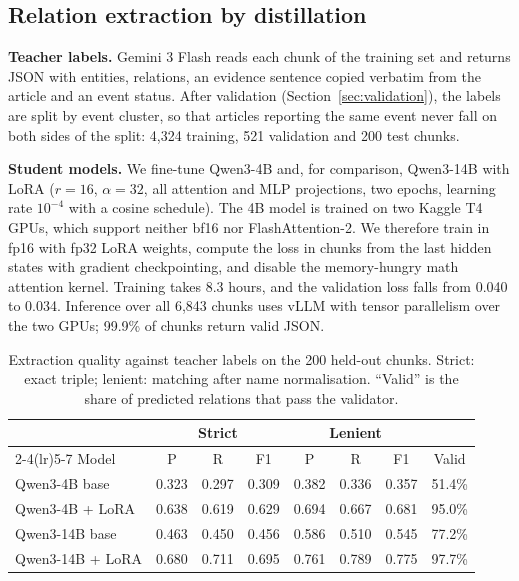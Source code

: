 \documentclass[11pt]{article}
\begin{document}
\subsection{Relation extraction by distillation}
\textbf{Teacher labels.} Gemini 3 Flash reads each chunk of the training set and returns JSON with entities, relations, an evidence sentence copied verbatim from the article and an event status. After validation (Section~\ref{sec:validation}), the labels are split by event cluster, so that articles reporting the same event never fall on both sides of the split: 4,324 training, 521 validation and 200 test chunks.

\textbf{Student models.} We fine-tune Qwen3-4B and, for comparison, Qwen3-14B \cite{yang2025qwen3} with LoRA \cite{hu2022lora} ($r=16$, $\alpha=32$, all attention and MLP projections, two epochs, learning rate $10^{-4}$ with a cosine schedule). The 4B model is trained on two Kaggle T4 GPUs, which support neither bf16 nor FlashAttention-2. We therefore train in fp16 with fp32 LoRA weights, compute the loss in chunks from the last hidden states with gradient checkpointing, and disable the memory-hungry math attention kernel. Training takes 8.3 hours, and the validation loss falls from 0.040 to 0.034. Inference over all 6,843 chunks uses vLLM \cite{kwon2023efficient} with tensor parallelism over the two GPUs; 99.9\% of chunks return valid JSON.

\begin{table}[t]\centering\small
\caption{Extraction quality against teacher labels on the 200 held-out chunks. Strict: exact triple; lenient: matching after name normalisation. ``Valid'' is the share of predicted relations that pass the validator.}
\label{tab:extraction}
\begin{tabular}{@{}lccccccc@{}}\toprule
& \multicolumn{3}{c}{Strict} & \multicolumn{3}{c}{Lenient} & \\\cmidrule(lr){2-4}\cmidrule(lr){5-7}
Model & P & R & F1 & P & R & F1 & Valid\\\midrule
Qwen3-4B base & 0.323 & 0.297 & 0.309 & 0.382 & 0.336 & 0.357 & 51.4\%\\
Qwen3-4B + LoRA & 0.638 & 0.619 & 0.629 & 0.694 & 0.667 & 0.681 & 95.0\%\\\midrule
Qwen3-14B base & 0.463 & 0.450 & 0.456 & 0.586 & 0.510 & 0.545 & 77.2\%\\
Qwen3-14B + LoRA & 0.680 & 0.711 & 0.695 & 0.761 & 0.789 & 0.775 & 97.7\%\\\bottomrule
\end{tabular}
\end{table}
\end{document}
